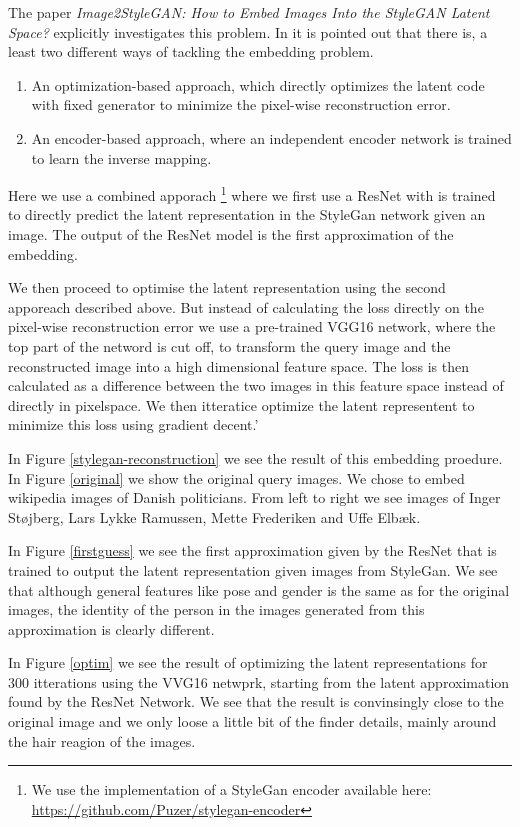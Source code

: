 The paper \textit{Image2StyleGAN: How to Embed Images Into the StyleGAN Latent Space?}\cite{Image2StyleGAN} explicitly investigates this problem.
In \cite{interfacegan} it is pointed out that there is, a least two different ways of tackling the embedding problem.

\begin{enumerate}
    \item An optimization-based
    approach, which directly optimizes the latent code with fixed generator to minimize the pixel-wise reconstruction error.
    \item An encoder-based approach, where an independent encoder network is trained to learn the inverse mapping. 
\end{enumerate}

Here we use a combined apporach \footnote{We use the implementation of a StyleGan encoder available here: \url{https://github.com/Puzer/stylegan-encoder}}
where we first use a ResNet with is trained to directly predict the latent representation in the StyleGan network given an image. The output of the ResNet model is the first approximation of the embedding. 

We then proceed to optimise the latent representation using the second apporeach described above. But instead of calculating the loss directly on the pixel-wise reconstruction error we use a pre-trained VGG16 network, where the top part of the netword is cut off,  to transform the query image and the reconstructed image into a high dimensional feature space. The loss is then calculated as a difference between the two images in this feature space instead of directly in pixelspace. We then itteratice optimize the latent representent to minimize this loss using gradient decent.'

In Figure \ref{stylegan-reconstruction} we see the result of this embedding proedure. In Figure \ref{original} we show the original query images. We chose to embed wikipedia images of Danish politicians. From left to right we see images of Inger Støjberg, Lars Lykke Ramussen, Mette Frederiken and Uffe Elbæk. 

In Figure \ref{firstguess} we see the first approximation given by the ResNet that is trained to output the latent representation given images from StyleGan. We see that although general features like pose and gender is the same as for the original images, the identity of the person in the images generated from this approximation is clearly different. 

In Figure \ref{optim} we see the result of optimizing the latent representations for 300 itterations using the VVG16 netwprk, starting from the latent approximation found by the ResNet Network. We see that the result is convinsingly close to the original image and we only loose a little bit of the finder details, mainly around the hair reagion of the images.

